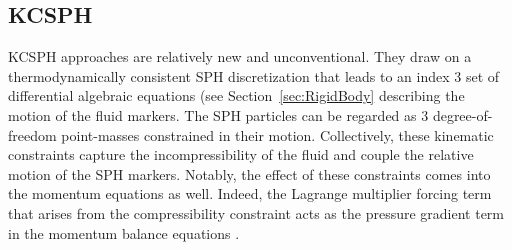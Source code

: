 \subsection{KCSPH}
\label{sec:KCSPH}
KCSPH approaches are relatively new and unconventional. They draw on a thermodynamically consistent SPH discretization \cite{espanol_smoothed_2003} that leads to an index 3 set of differential algebraic equations (see Section~\ref{sec:RigidBody} describing the motion of the fluid markers. The SPH particles can be regarded as 3 degree-of-freedom point-masses constrained in their motion. Collectively, these kinematic constraints capture the incompressibility of the fluid and couple the relative motion of the SPH markers. Notably, the effect of these constraints comes into the momentum equations as well. Indeed, the Lagrange multiplier forcing term that arises from the compressibility constraint acts as the pressure gradient term in the momentum balance equations \cite{espanol_smoothed_2003,constrFluid2007,claudeIncompFluids2012,hammadConstrFluid2018}. 

